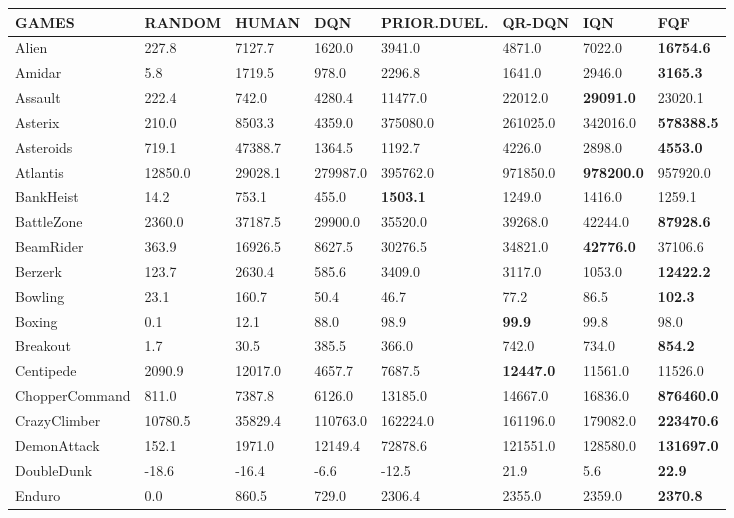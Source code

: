 \documentclass{article}
\begin{document}
\begin{table*}[ht]
\scriptsize
	\centering
    \begin{tabular}{l|l|l|l|l|l|l|l}
GAMES & RANDOM & HUMAN & DQN & PRIOR.DUEL. & QR-DQN & IQN & FQF \\ \hline
Alien & 227.8 & 7127.7 & 1620.0 & 3941.0 & 4871.0 & 7022.0 & \textbf{16754.6}\\ 
Amidar & 5.8 & 1719.5 & 978.0 & 2296.8 & 1641.0 & 2946.0 & \textbf{3165.3}\\ 
Assault & 222.4 & 742.0 & 4280.4 & 11477.0 & 22012.0 & \textbf{29091.0} & 23020.1\\ 
Asterix & 210.0 & 8503.3 & 4359.0 & 375080.0 & 261025.0 & 342016.0 & \textbf{578388.5}\\ 
Asteroids & 719.1 & 47388.7 & 1364.5 & 1192.7 & 4226.0 & 2898.0 & \textbf{4553.0}\\ 
Atlantis & 12850.0 & 29028.1 & 279987.0 & 395762.0 & 971850.0 & \textbf{978200.0} & 957920.0\\ 
BankHeist & 14.2 & 753.1 & 455.0 & \textbf{1503.1} & 1249.0 & 1416.0 & 1259.1\\ 
BattleZone & 2360.0 & 37187.5 & 29900.0 & 35520.0 & 39268.0 & 42244.0 & \textbf{87928.6}\\ 
BeamRider & 363.9 & 16926.5 & 8627.5 & 30276.5 & 34821.0 & \textbf{42776.0} & 37106.6\\ 
Berzerk & 123.7 & 2630.4 & 585.6 & 3409.0 & 3117.0 & 1053.0 & \textbf{12422.2}\\ 
Bowling & 23.1 & 160.7 & 50.4 & 46.7 & 77.2 & 86.5 & \textbf{102.3}\\ 
Boxing & 0.1 & 12.1 & 88.0 & 98.9 & \textbf{99.9} & 99.8 & 98.0\\ 
Breakout & 1.7 & 30.5 & 385.5 & 366.0 & 742.0 & 734.0 & \textbf{854.2}\\ 
Centipede & 2090.9 & 12017.0 & 4657.7 & 7687.5 & \textbf{12447.0} & 11561.0 & 11526.0\\ 
ChopperCommand & 811.0 & 7387.8 & 6126.0 & 13185.0 & 14667.0 & 16836.0 & \textbf{876460.0}\\ 
CrazyClimber & 10780.5 & 35829.4 & 110763.0 & 162224.0 & 161196.0 & 179082.0 & \textbf{223470.6}\\ 
DemonAttack & 152.1 & 1971.0 & 12149.4 & 72878.6 & 121551.0 & 128580.0 & \textbf{131697.0}\\ 
DoubleDunk & -18.6 & -16.4 & -6.6 & -12.5 & 21.9 & 5.6 & \textbf{22.9}\\ 
Enduro & 0.0 & 860.5 & 729.0 & 2306.4 & 2355.0 & 2359.0 & \textbf{2370.8}\\ 

\end{tabular}
\end{table*}
\end{document}
